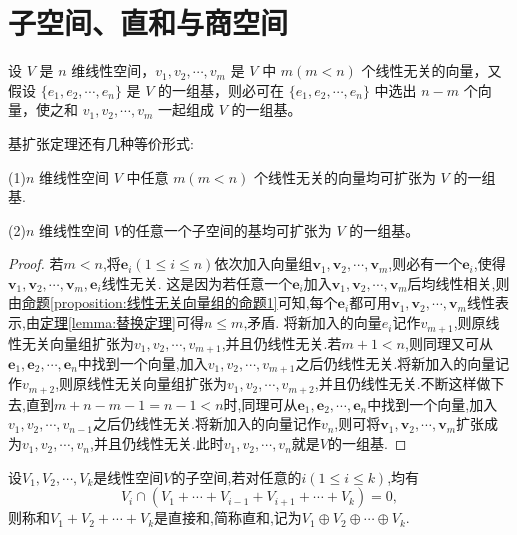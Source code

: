 \documentclass[../../main.tex]{subfiles}%
\begin{document}
\section{子空间、直和与商空间}

\begin{theorem}[基扩张定理]\label{theorem:基扩张定理}
设 $V$ 是 $n$ 维线性空间，$v_1, v_2, \cdots, v_m$ 是 $V$ 中 $m (m < n)$ 个线性无关的向量，又假设 $\{e_1, e_2, \cdots, e_n\}$ 是 $V$ 的一组基，则必可在 $\{e_1, e_2, \cdots, e_n\}$ 中选出 $n - m$ 个向量，使之和 $v_1, v_2, \cdots, v_m$ 一起组成 $V$ 的一组基。

基扩张定理还有几种等价形式:

(1)$n$ 维线性空间 $V$ 中任意 $m (m < n)$ 个线性无关的向量均可扩张为 $V$ 的一组基.

(2)$n$ 维线性空间 $V$的任意一个子空间的基均可扩张为 $V$ 的一组基。
\end{theorem}
\begin{proof}

若\(m< n\),将\(\boldsymbol{e}_i(1\leqslant  i\leqslant  n)\)依次加入向量组\(\boldsymbol{v}_1,\boldsymbol{v}_2,\cdots,\boldsymbol{v}_m\),则必有一个\(\boldsymbol{e}_i\),使得\(\boldsymbol{v}_1,\boldsymbol{v}_2,\cdots,\boldsymbol{v}_m,\boldsymbol{e}_i\)线性无关. 这是因为若任意一个\(\boldsymbol{e}_i\)加入\(\boldsymbol{v}_1,\boldsymbol{v}_2,\cdots,\boldsymbol{v}_m\)后均线性相关,则由\hyperref[proposition:线性无关向量组的命题1]{命题\ref{proposition:线性无关向量组的命题1}}可知,每个\(\boldsymbol{e}_i\)都可用\(\boldsymbol{v}_1,\boldsymbol{v}_2,\cdots,\boldsymbol{v}_m\)线性表示,由\hyperref[lemma:替换定理]{定理\ref{lemma:替换定理}}可得\(n\leqslant  m\),矛盾. 将新加入的向量$e_i$记作$v_{m+1}$,则原线性无关向量组扩张为$v_1,v_2,\cdots,v_{m+1}$,并且仍线性无关.若\(m + 1< n\),则同理又可从\(\boldsymbol{e}_1,\boldsymbol{e}_2,\cdots,\boldsymbol{e}_n\)中找到一个向量,加入$v_1,v_2,\cdots,v_{m+1}$之后仍线性无关.将新加入的向量记作$v_{m+2}$,则原线性无关向量组扩张为$v_1,v_2,\cdots,v_{m+2}$,并且仍线性无关.不断这样做下去,直到$m+n-m-1=n-1<n$时,同理可从\(\boldsymbol{e}_1,\boldsymbol{e}_2,\cdots,\boldsymbol{e}_n\)中找到一个向量,加入$v_1,v_2,\cdots,v_{n-1}$之后仍线性无关.将新加入的向量记作$v_{n}$,则可将\(\boldsymbol{v}_1,\boldsymbol{v}_2,\cdots,\boldsymbol{v}_m\)扩张成为$v_1,v_2,\cdots,v_{n}$,并且仍线性无关.此时$v_1,v_2,\cdots,v_{n}$就是\(V\)的一组基.

\end{proof}

\begin{definition}[直和]\label{definition:直和}
设\(V_1,V_2,\cdots,V_k\)是线性空间\(V\)的子空间,若对任意的\(i(1\leqslant  i\leqslant  k)\),均有
\[
V_i\cap(V_1+\cdots+V_{i - 1}+V_{i + 1}+\cdots+V_k)=0,
\]
则称和\(V_1 + V_2+\cdots+V_k\)是直接和,简称直和,记为\(V_1\oplus V_2\oplus\cdots\oplus V_k\).
\end{definition}
\end{document}
